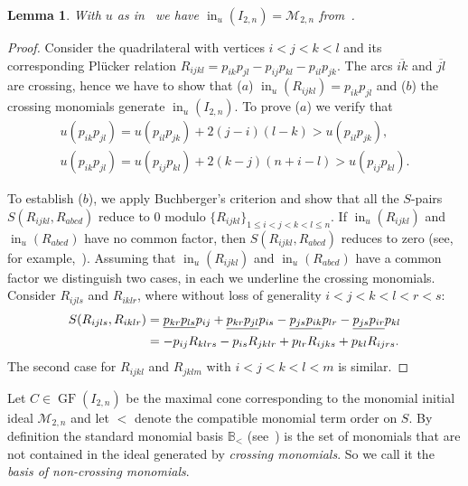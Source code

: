 \documentclass[pdftex]{sigma}%
\newtheorem{Lemma}[Theorem]{Lemma}
\numberwithin{equation}{section}
\DeclareMathOperator{\init}{in}
\DeclareMathOperator{\GF}{GF}
\begin{document}
\begin{Lemma}
With $u$ as in~ we have $\init_u(I_{2,n})=\mathcal M_{2,n}$
from~.
\end{Lemma}
\begin{proof}
Consider the quadrilateral with vertices $i<j<k<l$ and its corresponding Pl\"ucker relation $R_{ijkl}=p_{ik}p_{jl}-p_{ij}p_{kl}-p_{il}p_{jk}$.
The arcs $\overline{ik}$ and $\overline{jl}$ are crossing, hence we have to show that ($a$) $\init_u(R_{ijkl})=p_{ik}p_{jl}$ and ($b$) the crossing monomials generate $\init_u(I_{2,n})$.
To prove ($a$) we verify that
\begin{gather*}
u(p_{ik}p_{jl}) = u(p_{il}p_{jk}) +2(j-i)(l-k) > u(p_{il}p_{jk}),
\\
u(p_{ik}p_{jl}) = u(p_{ij}p_{kl})+2(k-j)(n+i-l)>u(p_{ij}p_{kl}).
\end{gather*}


To establish ($b$), we apply Buchberger's criterion and show that all the $S$-pairs $S(R_{ijkl},R_{abcd})$ reduce to $0$ modulo $\{R_{ijkl}\}_{ 1\le i<j<k<l\le n}$.
If $\init_u(R_{ijkl})$ and $\init_u(R_{abcd})$ have no common factor, then $S(R_{ijkl},R_{abcd})$ reduces to zero (see, for example,~\cite[Lemma~2.3.1]{herzog2011monomial}).
Assuming that $\init_u(R_{ijkl})$ and $\init_u(R_{abcd})$ have a common factor we distinguish two cases, in each we underline the crossing monomials.
Consider $R_{ijls}$ and $R_{iklr}$, where without loss of generality $i<j<k<l<r<s$:
\begin{gather*}\begin{split}
 & S(R_{ijls},R_{iklr})
 = \underline{p_{kr}p_{ls}}p_{ij} + \underline{p_{kr}p_{jl}}p_{is} - \underline{p_{js}p_{ik}}p_{lr} - \underline{p_{js}p_{ir}}p_{kl}
 \\
& \hphantom{S(R_{ijls},R_{iklr})}{} = -p_{ij} R_{klrs}- p_{is} R_{jklr}+ p_{lr} R_{ijks}+ p_{kl}R_{ijrs}.
\end{split}
 \end{gather*}
The second case for $R_{ijkl}$ and $R_{jklm}$ with $i<j<k<l<m$ is similar.
\end{proof}

Let $C\in \GF(I_{2,n})$ be the maximal cone corresponding to the monomial initial ideal $\mathcal M_{2,n}$ and let $<$ denote the compatible monomial term order on $S$. %
By definition the standard monomial basis $\mathbb B_<$ (see~) is the set of monomials that are not contained in the ideal generated by \emph{crossing monomials}.
So we call it the {\it basis of non-crossing monomials}.
\end{document}
